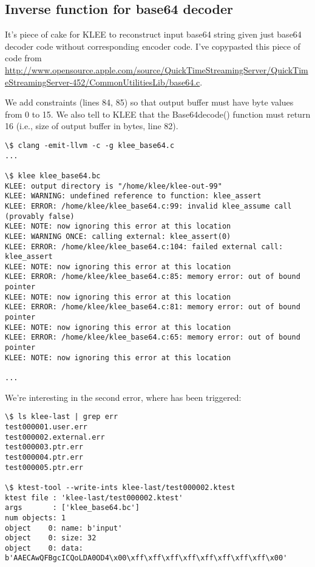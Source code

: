 \subsection{Inverse function for base64 decoder}

It's piece of cake for KLEE to reconstruct input base64 string given just base64 decoder code without corresponding encoder code.
I've copypasted this piece of code from
\url{http://www.opensource.apple.com/source/QuickTimeStreamingServer/QuickTimeStreamingServer-452/CommonUtilitiesLib/base64.c}.

We add constraints (lines 84, 85) so that output buffer must have byte values from 0 to 15.
We also tell to KLEE that the Base64decode() function must return 16 (i.e., size of output buffer in bytes, line 82).



\begin{lstlisting}
\$ clang -emit-llvm -c -g klee_base64.c
...

\$ klee klee_base64.bc
KLEE: output directory is "/home/klee/klee-out-99"
KLEE: WARNING: undefined reference to function: klee_assert
KLEE: ERROR: /home/klee/klee_base64.c:99: invalid klee_assume call (provably false)
KLEE: NOTE: now ignoring this error at this location
KLEE: WARNING ONCE: calling external: klee_assert(0)
KLEE: ERROR: /home/klee/klee_base64.c:104: failed external call: klee_assert
KLEE: NOTE: now ignoring this error at this location
KLEE: ERROR: /home/klee/klee_base64.c:85: memory error: out of bound pointer
KLEE: NOTE: now ignoring this error at this location
KLEE: ERROR: /home/klee/klee_base64.c:81: memory error: out of bound pointer
KLEE: NOTE: now ignoring this error at this location
KLEE: ERROR: /home/klee/klee_base64.c:65: memory error: out of bound pointer
KLEE: NOTE: now ignoring this error at this location

...
\end{lstlisting}

We're interesting in the second error, where  has been triggered:

\begin{lstlisting}
\$ ls klee-last | grep err
test000001.user.err
test000002.external.err
test000003.ptr.err
test000004.ptr.err
test000005.ptr.err

\$ ktest-tool --write-ints klee-last/test000002.ktest
ktest file : 'klee-last/test000002.ktest'
args       : ['klee_base64.bc']
num objects: 1
object    0: name: b'input'
object    0: size: 32
object    0: data: b'AAECAwQFBgcICQoLDA0OD4\x00\xff\xff\xff\xff\xff\xff\xff\xff\x00'
\end{lstlisting}

